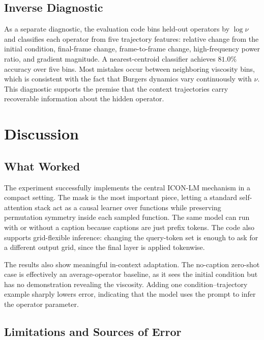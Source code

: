 \documentclass[11pt]{article}
\providecommand{\ToyInverseAcc}{81.0\%}
\begin{document}
\subsection{Inverse Diagnostic}

As a separate diagnostic, the evaluation code bins held-out operators by
$\log\nu$ and classifies each operator from five trajectory features: relative
change from the initial condition, final-frame change, frame-to-frame change,
high-frequency power ratio, and gradient magnitude. A nearest-centroid classifier
achieves $\ToyInverseAcc$ accuracy over five bins. Most mistakes occur between
neighboring viscosity bins, which is consistent with the fact that Burgers
dynamics vary continuously with $\nu$. This diagnostic supports the premise that
the context trajectories carry recoverable information about the hidden operator.

\section{Discussion}
\label{sec:discussion}

\subsection{What Worked}

The experiment successfully implements the central ICON-LM mechanism in a compact
setting. The mask is the most important piece, letting a standard self-attention
stack act as a causal learner over functions while preserving permutation
symmetry inside each sampled function. The same model can run with or without a
caption because captions are just prefix tokens. The code also supports
grid-flexible inference: changing the query-token set is enough to ask for a
different output grid, since the final layer is applied tokenwise.

The results also show meaningful in-context adaptation. The no-caption
zero-shot case is effectively an average-operator baseline, as it sees the initial
condition but has no demonstration revealing the viscosity. Adding one
condition--trajectory example sharply lowers error, indicating that the model uses
the prompt to infer the operator parameter.

\subsection{Limitations and Sources of Error}
\end{document}
